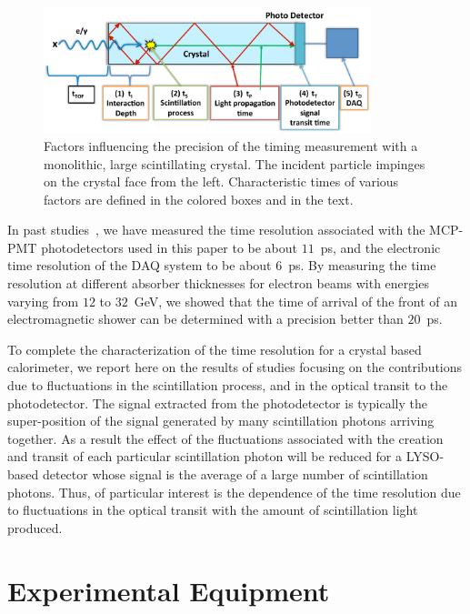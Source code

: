 \documentclass[12pt]{article}
\begin{document}
\begin{figure}[h] \centering
\includegraphics[width=0.85\textwidth]{figs/ScintillatorTiming_v2} \caption{Factors
influencing the precision of the timing measurement with a monolithic, large
scintillating crystal. The incident particle impinges on the crystal face from
the left. Characteristic times of various factors are defined in the colored
boxes and in the text.}
\label{fig:ScintillatorTiming}
\end{figure}

In past studies~\cite{MCPFastCaloNIMA}, we have measured the time resolution
associated with the MCP-PMT photodetectors used in this paper to be
about $11$~ps, and the electronic time resolution
of the DAQ system to be about $6$~ps. By measuring the time
resolution at different absorber thicknesses for electron beams with
energies varying from $12$ to $32$~GeV, we showed that the 
time of arrival of the front of an electromagnetic shower
can be determined with a precision better than $20$~ps.

To complete the characterization of the time resolution
for a crystal based calorimeter, we report here on the results
of studies focusing on the contributions due to fluctuations
in the scintillation process, and in the optical transit
to the photodetector. The signal extracted from the photodetector is 
typically the super-position of the signal generated by many 
scintillation photons arriving together. As a result the effect of 
the fluctuations associated with the creation and transit of 
each particular scintillation photon will be reduced for a LYSO-based 
detector whose signal is the average of a large number of scintillation 
photons. Thus, of particular interest is the dependence of
the time resolution due to fluctuations in the optical transit
with the amount of scintillation light produced.


\section{Experimental Equipment}
\end{document}
